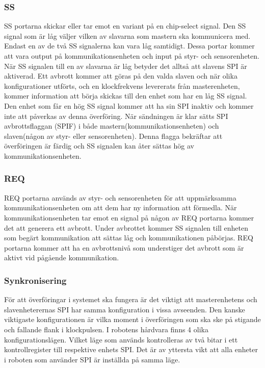 \subsubsection{SS}
SS portarna skickar eller tar emot en variant på en chip-select signal. Den SS signal som är låg väljer vilken av slavarna som mastern ska kommunicera med. Endast en av de två SS signalerna kan vara låg samtidigt. Dessa portar kommer att vara output på kommunikationsenheten och input på styr- och sensorenheten.
När SS signalen till en av slavarna är låg betyder det alltså att slavens SPI är aktiverad. Ett avbrott kommer att göras på den valda slaven och när olika konfigurationer utförts, och en klockfrekvens levererats från masterenheten, kommer information att börja skickas till den enhet som har en låg SS signal. Den enhet som får en hög SS signal kommer att ha sin SPI inaktiv och kommer inte att påverkas av denna överföring.
När sändningen är klar sätts SPI avbrottsflaggan (SPIF) i både mastern(kommunikationsenheten) och slaven(någon av styr- eller sensorenheten). Denna flagga bekräftar att överföringen är färdig och SS signalen kan åter sättas hög av kommunikationsenheten.

\subsubsection{REQ}
REQ portarna används av styr- och sensorenheten för att uppmärksamma kommunikationsenheten om att dem har ny information att förmedla. När kommunikationsenheten tar emot en signal på någon av REQ portarna kommer det att generera ett avbrott. Under avbrottet kommer SS signalen till enheten som begärt kommunikation att sättas låg och kommunikationen påbörjas.  REQ portarna kommer att ha en avbrottsnivå som understiger det avbrott som är aktivt vid pågående kommunikation.

\subsubsection{Synkronisering}
För att överföringar i systemet ska fungera är det viktigt att masterenhetens och slavenheterernas SPI har samma konfiguration i vissa avseenden. Den kanske viktigaste konfigurationen är vilka moment i överföringen som ska ske på stigande och fallande flank i klockpulsen. I robotens hårdvara finns 4 olika konfigurationslägen. Vilket läge som används kontrolleras av två bitar i ett kontrollregister till respektive enhets SPI. Det är av yttersta vikt att alla enheter i roboten som använder SPI är inställda på samma läge.

